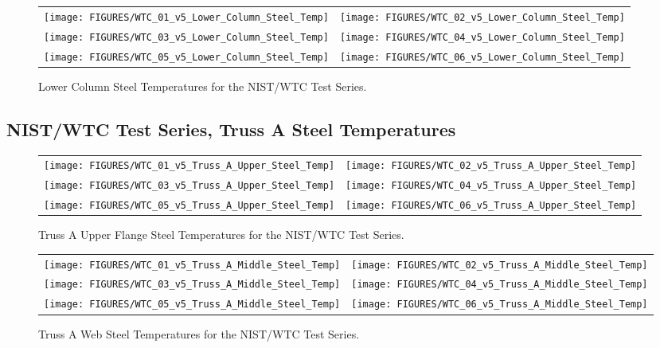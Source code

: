 \begin{figure}[p]
\begin{tabular*}{\textwidth}{l@{\extracolsep{\fill}}r}
\texttt{[image: FIGURES/WTC\_01\_v5\_Lower\_Column\_Steel\_Temp]} &
\texttt{[image: FIGURES/WTC\_02\_v5\_Lower\_Column\_Steel\_Temp]} \\
\texttt{[image: FIGURES/WTC\_03\_v5\_Lower\_Column\_Steel\_Temp]} &
\texttt{[image: FIGURES/WTC\_04\_v5\_Lower\_Column\_Steel\_Temp]} \\
\texttt{[image: FIGURES/WTC\_05\_v5\_Lower\_Column\_Steel\_Temp]} &
\texttt{[image: FIGURES/WTC\_06\_v5\_Lower\_Column\_Steel\_Temp]}
\end{tabular*}
\caption{Lower Column Steel Temperatures for the NIST/WTC Test Series.}
\label{NIST_WTC_Lower_Column_Steel}
\end{figure}

\clearpage



\subsection{NIST/WTC Test Series, Truss A Steel Temperatures}

\vspace{1in}

\begin{figure}[h!]
\begin{tabular*}{\textwidth}{l@{\extracolsep{\fill}}r}
\texttt{[image: FIGURES/WTC\_01\_v5\_Truss\_A\_Upper\_Steel\_Temp]} &
\texttt{[image: FIGURES/WTC\_02\_v5\_Truss\_A\_Upper\_Steel\_Temp]} \\
\texttt{[image: FIGURES/WTC\_03\_v5\_Truss\_A\_Upper\_Steel\_Temp]} &
\texttt{[image: FIGURES/WTC\_04\_v5\_Truss\_A\_Upper\_Steel\_Temp]} \\
\texttt{[image: FIGURES/WTC\_05\_v5\_Truss\_A\_Upper\_Steel\_Temp]} &
\texttt{[image: FIGURES/WTC\_06\_v5\_Truss\_A\_Upper\_Steel\_Temp]}
\end{tabular*}
\caption{Truss A Upper Flange Steel Temperatures for the NIST/WTC Test Series.}
\label{NIST_WTC_Truss_A_Upper_Steel}
\end{figure}

\begin{figure}[p]
\begin{tabular*}{\textwidth}{l@{\extracolsep{\fill}}r}
\texttt{[image: FIGURES/WTC\_01\_v5\_Truss\_A\_Middle\_Steel\_Temp]} &
\texttt{[image: FIGURES/WTC\_02\_v5\_Truss\_A\_Middle\_Steel\_Temp]} \\
\texttt{[image: FIGURES/WTC\_03\_v5\_Truss\_A\_Middle\_Steel\_Temp]} &
\texttt{[image: FIGURES/WTC\_04\_v5\_Truss\_A\_Middle\_Steel\_Temp]} \\
\texttt{[image: FIGURES/WTC\_05\_v5\_Truss\_A\_Middle\_Steel\_Temp]} &
\texttt{[image: FIGURES/WTC\_06\_v5\_Truss\_A\_Middle\_Steel\_Temp]}
\end{tabular*}
\caption{Truss A Web Steel Temperatures for the NIST/WTC Test Series.}
\label{NIST_WTC_Truss_A_Middle_Steel}
\end{figure}

